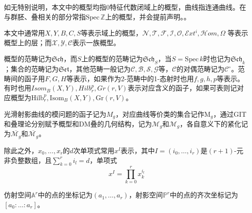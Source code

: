 如无特别说明，本文中的概型均指$ 0 $特征代数闭域上的概型，曲线指连通曲线。在与群胚、叠相关的部分常指$ \mathrm{Spec}\,\mathbb{Z} $上的概型，并会提前声明。。

本文中通常用$ X,Y,B,C,S $等表示域上的概型，$ \mathscr{N,T,F} ,$$ \mathscr{I,O,E}\!xt^i,\mathscr{H}\!om ,\Omega$ 等表示概型上的层；而$ \mathcal{X},\mathcal{Y},\mathcal{C} $表示一族概型。

概型的范畴记为$ \mathfrak{Sch} $，而$ S $上的概型的范畴记为$ \mathfrak{Sch}_S $，当$ S=\mathrm{Spec}\,k $时也记为$ \mathfrak{Sch}_k $；集合的范畴记为$ \mathfrak{Set} $，其他范畴一般记为$ \mathscr{C},\mathscr{B},\mathscr{S},\mathscr{G} $等，$ \mathscr{C} $的对偶范畴记为$ \mathscr{C}^\circ $。范畴间的函子用$ F,G,H $等表示，如果作为2-范畴中的1-态射时也用$ f,g,h,p $等表示。有时也用$ Isom_B(X,Y),Hilb_r^p ,Gr(r,V)$表示对应含义的函子，如果可表则记对应概型为$ \mathrm{Hilb}_{r}^{p},\mathrm{Isom}_B(X,Y),\mathrm{Gr}(r,V)$。

光滑射影曲线的模问题的函子记为$ M_g $，对应曲线等价类的集合记作$ \mathrm{M}_g $，通过GIT和叠理论分别赋予概型和DM叠的几何结构，记为$ \mathcal{M}_g $和$ \mathscr{M}_g $，各自意义下的紧化记为$ \overline{\mathcal{M}_g} $和$ \overline{\mathscr{M}_g} $。

除此之外，$ x_0,\ldots,x_r $的$ d $次单项式常用$ x^I $表示，其中$ I=(i_0,\ldots,i_r) $是$ (r+1) $-元非负整数组，且$ \sum_{k=0}^{r}i_l=d $，单项式$$ x^I=\prod_{k=0}^{r}x_k^{i_l} $$

仿射空间$ \mathbb{A}^r $中的点的坐标记为$ (a_1,\ldots,a_r) $，射影空间$ \mathbb{P}^r $中的点的齐次坐标记为$ [a_0:\ldots:a_r]  $。

